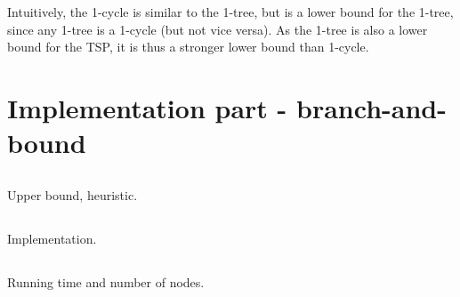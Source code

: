 \documentclass[11pt,a4paper,english]{article}
\begin{document}
Intuitively, the 1-cycle is similar to the 1-tree, but is a lower bound for the 1-tree, since any 1-tree is a 1-cycle (but not vice versa). As the 1-tree is also a lower bound for the TSP, it is thus a stronger lower bound than 1-cycle.
\clearpage

\section{Implementation part - branch-and-bound}

\subsection{}
Upper bound, heuristic.

\subsection{}
Implementation.

\subsection{}
Running time and number of nodes.
\end{document}
